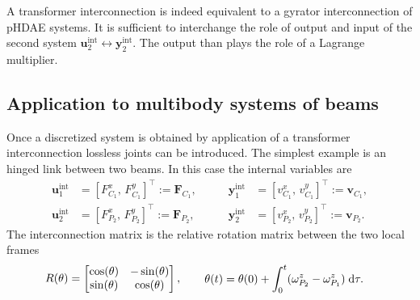 A transformer interconnection is indeed equivalent to a gyrator interconnection of pHDAE systems.
It is sufficient to interchange the role of output and input of the second system $\bm{u}_2^{\text{int}} \leftrightarrow \bm{y}_2^{\text{int}}$. The output than plays the role of a Lagrange multiplier. 


\subsection{Application to multibody systems of beams}
Once a discretized system is obtained by application of a transformer interconnection lossless joints can be introduced. The simplest example is an hinged link between two beams. In this case the internal variables are
\begin{equation*}
\begin{aligned}
\bm{u}_1^{\text{int}} &= [F^x_{C_1}, \, F^y_{C_1}]^\top := \bm{F}_{C_1}, \\
\bm{u}_2^{\text{int}} &= [F^x_{P_2}, \, F^y_{P_2}]^\top := \bm{F}_{P_2},
\end{aligned} \qquad
\begin{aligned}
\bm{y}_1^{\text{int}} &= [v^x_{C_1}, \, v^y_{C_1}]^\top := \bm{v}_{C_1}, \\
\bm{y}_2^{\text{int}} &= [v^x_{P_2}, \, v^y_{P_2}]^\top := \bm{v}_{P_2}.
\end{aligned}
\end{equation*}
The interconnection matrix is the relative rotation matrix between the two local frames
\begin{equation}
R(\theta) = \begin{bmatrix}
\cos(\theta) & - \sin(\theta) \\
\sin(\theta) & \cos(\theta) \\
\end{bmatrix}, \qquad 
\begin{aligned}
\theta(t) &= \theta(0) + \int_{0}^t (\omega^z_{P_2} - \omega^z_{P_1}) \d{\tau}.
\end{aligned}
\end{equation}

